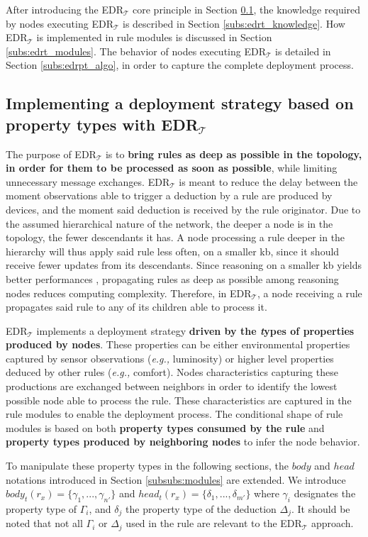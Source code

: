 \documentclass[sw]{iosart2x}
\newcommand{\edrt}{EDR$_{\mathcal{T}}$\xspace}
\begin{document}
After introducing the \edrt core principle in Section \textsection \ref{subs:overview_edrt}, the knowledge required by nodes executing \edrt is described in Section \textsection \ref{subs:edrt_knowledge}.
How \edrt is implemented in rule modules is discussed in Section \textsection \ref{subs:edrt_modules}.
The behavior of nodes executing \edrt is detailed in Section \textsection \ref{subs:edrpt_algo}, in order to capture the complete deployment process.

\subsection{Implementing a deployment strategy based on property types with \edrt}
\label{subs:overview_edrt}

The purpose of \edrt is to \textbf{bring rules as deep as possible in the topology, in order for them to be processed as soon as possible}, while limiting unnecessary message exchanges.
\edrt is meant to reduce the delay between the moment observations able to trigger a deduction by a rule are produced by devices, and the moment said deduction is received by the rule originator.
Due to the assumed hierarchical nature of the network, the deeper a node is in the topology, the fewer descendants it has.
A node processing a rule deeper in the hierarchy will thus apply said rule less often, on a smaller \gls{kb}, since it should receive fewer updates from its descendants.
Since reasoning on a smaller \gls{kb} yields better performances \cite{Maarala2017}, propagating rules as deep as possible among reasoning nodes reduces computing complexity.
Therefore, in \edrt, a node receiving a rule propagates said rule to any of its children able to process it. 

\edrt implements a deployment strategy \textbf{driven by the \textit{t}ypes of properties produced by nodes}.
These properties can be either environmental properties captured by sensor observations (\textit{e.g.,} luminosity) or higher level properties deduced by other rules (\textit{e.g.,} comfort).
Nodes characteristics capturing these productions are exchanged between neighbors in order to identify the lowest possible node able to process the rule.
These characteristics are captured in the rule modules to enable the deployment process.
The conditional shape of rule modules is based on both \textbf{property types consumed by the rule} and \textbf{property types produced by neighboring nodes} to infer the node behavior.

To manipulate these property types in the following sections, the $body$ and $head$ notations introduced in Section \textsection \ref{subsubs:modules} are extended. 
We introduce $body_t(r_{x})=\{\gamma_{1},...,\gamma_{n'}\}$ and $head_t(r_{x})=\{\delta_{1}, ..., \delta_{m'}\}$ where $\gamma_{i}$ designates the property type of $\Gamma_{i}$, and $\delta_{j}$ the property type of the deduction $\Delta_{j}$.
It should be noted that not all $\Gamma_{i}$ or $\Delta_{j}$ used in the rule are relevant to the \edrt approach.
\end{document}
